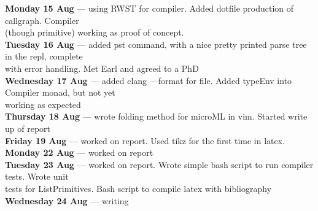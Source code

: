 \textbf{Monday 15 Aug}  --- using RWST for compiler. Added dotfile production of callgraph. Compiler \\
                   (though primitive) working as proof of concept. \\
\textbf{Tuesday 16 Aug}  --- added pst command, with a nice pretty printed parse tree in the repl, complete \\
                    with error handling. Met Earl and agreed to a PhD \\
\textbf{Wednesday 17 Aug}  --- added clang  ---format for file. Added typeEnv into Compiler monad, but not yet \\
                   working as expected \\
\textbf{Thursday 18 Aug}  --- wrote folding method for microML in vim. Started write up of report \\
\textbf{Friday 19 Aug}  --- worked on report. Used tikz for the first time in latex. \\
\textbf{Monday 22 Aug}  --- worked on report \\
\textbf{Tuesday 23 Aug}  --- worked on report. Wrote simple bash script to run compiler tests. Wrote unit \\
                   tests for ListPrimitives. Bash script to compile latex with bibliography \\
\textbf{Wednesday 24 Aug}  --- writing \\
